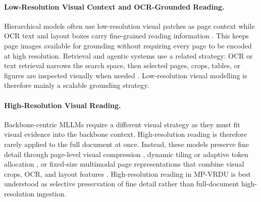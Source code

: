 \documentclass[11pt]{article}
\begin{document}
\paragraph{Low-Resolution Visual Context and OCR-Grounded Reading.}
Hierarchical models often use low-resolution visual patches as page context while OCR text and layout boxes carry fine-grained reading information \cite{tito2023hierarchical, blau2024gram, borchmann2025arctic}. This keeps page images available for grounding without requiring every page to be encoded at high resolution. Retrieval and agentic systems use a related strategy: OCR or text retrieval narrows the search space, then selected pages, crops, tables, or figures are inspected visually when needed \cite{zhang2024cream, lopez2025enhancing, sun2025docagent, zhu2025doclens, duan2025m2rag}. Low-resolution visual modelling is therefore mainly a scalable grounding strategy.


\paragraph{High-Resolution Visual Reading.}
Backbone-centric MLLMs require a different visual strategy as they must fit visual evidence into the backbone context. High-resolution reading is therefore rarely applied to the full document at once. Instead, these models preserve fine detail through page-level visual compression \cite{hu2025mplug}, dynamic tiling or adaptive token allocation \cite{jia2024leopard, duan2025docopilot}, or fixed-size multimodal page representations that combine visual crops, OCR, and layout features \cite{hannan2025docslm}. High-resolution reading in MP-VRDU is best understood as selective preservation of fine detail rather than full-document high-resolution ingestion.
\end{document}
